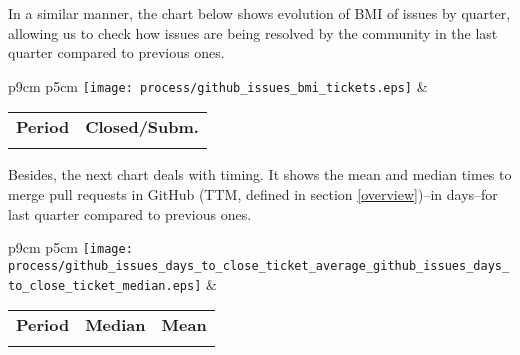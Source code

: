 In a similar manner, the chart below shows evolution of BMI of issues by quarter, allowing us to check how issues are being resolved by the community in the last quarter compared to previous ones.

\begin{tabular}{p{9cm} p{5cm}}
	\vspace{0pt} 
	\hspace*{-6cm}  
	\texttt{[image: process/github\_issues\_bmi\_tickets.eps]}
	& 
	\vspace{0pt}
	\begin{tabular}{l|l}%
		\bfseries Period & \bfseries Closed/Subm. %
		\csvreader[head to column names]{process/github_issues_bmi_tickets.csv}{}%
		{\\\Date  & \bmi}
	\end{tabular}
\end{tabular}

Besides, the next chart deals with timing. It shows the mean and median times to merge pull requests in GitHub (TTM, defined in section \ref{overview})--in days--for last quarter compared to previous ones.


\begin{tabular}{p{9cm} p{5cm}}
	\vspace{0pt} 
	\hspace*{-6cm}  
	\texttt{[image: process/github\_issues\_days\_to\_close\_ticket\_average\_github\_issues\_days\_to\_close\_ticket\_median.eps]}
	& 
	\vspace{0pt}
	\begin{tabular}{l|r|r|}%
		\bfseries Period & \bfseries Median & \bfseries Mean %
		\csvreader[head to column names]{process/github_issues_days_to_close_ticket_average_github_issues_days_to_close_ticket_median.csv}{}%
		{\\\Date & \daystocloseticketmedian & \daystocloseticketaverage}
	\end{tabular}
\end{tabular}